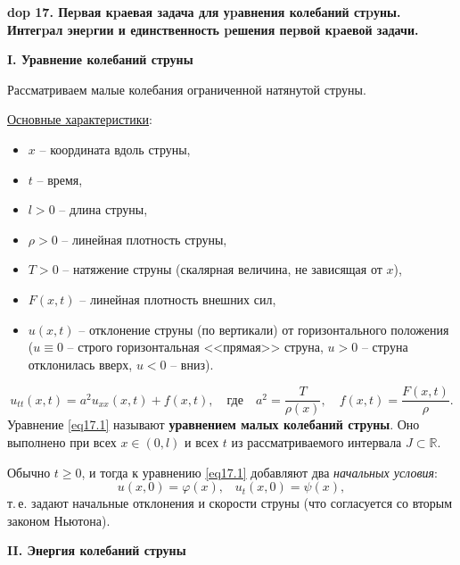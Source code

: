 \setcounter{section}{4}
\setcounter{subsection}{17}
\setcounter{equation}{0}
\textbf{\LARGE dop 17.  Пеpвая кpаевая задача для уpавнения колебаний стpуны. Интегpал энеpгии и единственность pешения пеpвой кpаевой задачи.}

\textbf{\quad I. Уравнение колебаний струны}

\noindent Рассматриваем малые колебания ограниченной натянутой струны.

\noindent\underline{Основные характеристики}:
\begin{itemize}
    \item $x$ -- координата вдоль струны,
    \item $t$ -- время,
    \item $l>0$ -- длина струны,
    \item $\rho>0$ -- линейная плотность струны,
    \item $T>0$ -- натяжение струны (скалярная величина, не зависящая от $x$),
    \item $F(x, t)$ -- линейная плотность внешних сил,
    \item $u(x, t)$ -- отклонение струны (по вертикали) от горизонтального положения ($u \equiv 0$ -- строго горизонтальная <<прямая>> струна, \;$u>0$ -- струна отклонилась вверх, \;$u<0$ -- вниз).
\end{itemize}

\begin{equation}
    u_{tt}(x, t) = a^2 u_{xx}(x, t) + f(x, t), \quad\text{где}\quad a^2 = \frac{T}{\rho(x)}, \quad f(x, t) = \frac{F(x, t)}{\rho}. \label{eq17.1}
\end{equation}
\noindent Уравнение \eqref{eq17.1} называют \textbf{уравнением малых колебаний струны}. Оно выполнено при всех $x \in (0, l)$ и всех $t$ из рассматриваемого интервала $J \subset \mathbb{R}$. 

Обычно $t \geq 0$, и тогда к уравнению \eqref{eq17.1} добавляют два \textit{начальных условия}: $$u(x, 0) = \varphi(x),\;\;\; u_t(x, 0) = \psi(x),$$ т.\,е. задают начальные отклонения и скорости струны (что согласуется со вторым законом Ньютона).

\textbf{\quad II. Энергия колебаний струны}

